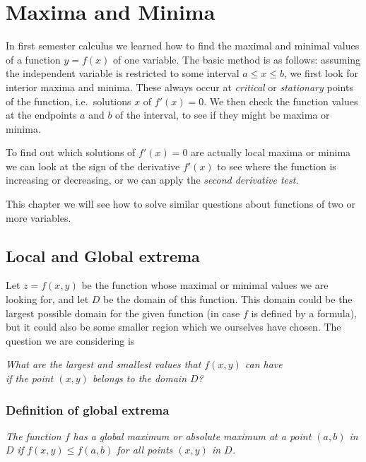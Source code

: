 \chapter{Maxima and Minima}  
In first semester calculus we learned how to find the maximal and minimal values of a
function $y=f(x)$ of one variable.  The basic method is as follows: assuming the
independent variable is restricted to some interval $a\leq x\leq b$, we first look
for interior maxima and minima.  These always occur at \emph{critical} or
\emph{stationary} points of the function, i.e.\ solutions $x$ of $f'(x)=0$.  We then
check the function values at the endpoints $a$ and $b$ of the interval, to see if
they might be maxima or minima.

To find out which solutions of $f'(x)=0$ are actually local maxima or minima we can look
at the sign of the derivative $f'(x)$ to see where the function is increasing or
decreasing, or we can apply the \emph{second derivative test.}

This chapter we will see how to solve similar questions about functions of two
or more variables.

\section{Local and Global extrema}     

\label{sec:local-versus-global} 
Let $z=f(x,y)$ be the function whose maximal or minimal values we are looking
for, and let $D$ be the domain of this function.  This domain could be the
largest possible domain for the given function (in case $f$ is defined by a
formula), but it could also be some smaller region which we ourselves have
chosen.  The question we are considering is
\begin{center}
  \itshape What are the largest and smallest values that $f(x,y)$ can have\\
  if the point $(x,y)$ belongs to the domain $D$?
\end{center}
\subsection{Definition of global extrema}     

\label{sec:def-global-extrema}\itshape 
The function $f$ has a \emph{global maximum} or \emph{absolute maximum} at a
point $(a,b)$ in $D$ if $f(x,y)\leq f(a,b)$ for all points $(x,y)$ in $D$.

